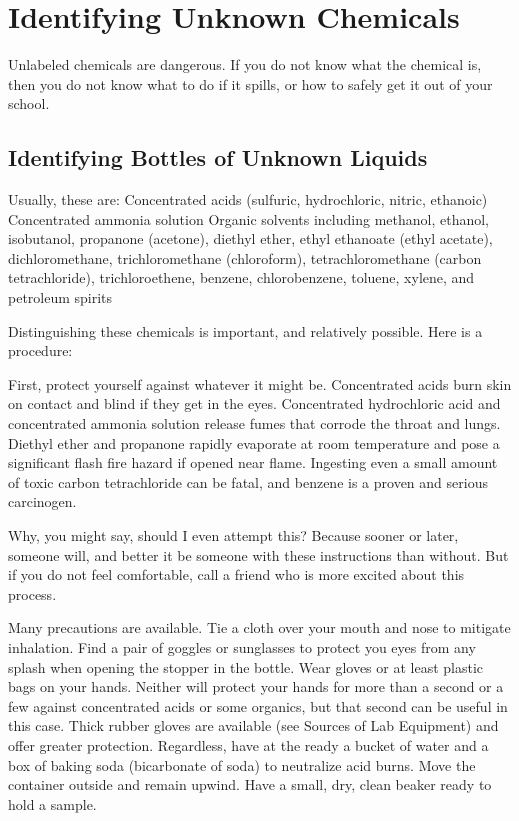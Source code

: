 \chapter{Identifying Unknown Chemicals}

Unlabeled chemicals are dangerous. 
If you do not know what the chemical is, 
then you do not know what to do if it spills, 
or how to safely get it out of your school.

\section{Identifying Bottles of Unknown Liquids}

Usually, 
these are:
Concentrated acids (sulfuric, 
hydrochloric, 
nitric, 
ethanoic)
Concentrated ammonia solution
Organic solvents including methanol, 
ethanol, 
isobutanol, 
propanone (acetone), 
diethyl ether, 
ethyl ethanoate (ethyl acetate), 
dichloromethane, 
trichloromethane (chloroform), 
tetrachloromethane (carbon tetrachloride), 
trichloroethene, 
benzene, 
chlorobenzene, 
toluene, 
xylene, 
and petroleum spirits

Distinguishing these chemicals is important, 
and relatively possible. 
Here is a procedure:

First, 
protect yourself against whatever it might be. 
Concentrated acids burn skin on contact and blind if they get in the eyes. 
Concentrated hydrochloric acid and concentrated ammonia solution 
release fumes that corrode the throat and lungs. 
Diethyl ether and propanone rapidly evaporate at room temperature 
and pose a significant flash fire hazard if opened near flame. 
Ingesting even a small amount of toxic carbon tetrachloride can be fatal, 
and benzene is a proven and serious carcinogen.

Why, 
you might say, 
should I even attempt this? Because sooner or later, 
someone will, 
and better it be someone with these instructions than without. 
But if you do not feel comfortable, 
call a friend who is more excited about this process.

Many precautions are available. 
Tie a cloth over your mouth and nose to mitigate inhalation. 
Find a pair of goggles or sunglasses to protect you eyes 
from any splash when opening the stopper in the bottle. 
Wear gloves or at least plastic bags on your hands. 
Neither will protect your hands for more than a second 
or a few against concentrated acids or some organics, 
but that second can be useful in this case. 
Thick rubber gloves are available (see Sources of Lab Equipment) 
and offer greater protection. 
Regardless, 
have at the ready a bucket of water and a box of baking soda 
(bicarbonate of soda) to neutralize acid burns. 
Move the container outside and remain upwind. 
Have a small, 
dry, 
clean beaker ready to hold a sample.

